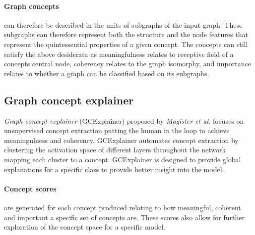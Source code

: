 
\paragraph{Graph concepts} can therefore be described in the units of subgraphs of the input graph.
These subgraphs can therefore represent both the structure and the node features that represent the quintessential properties of a given concept.
The concepts can still satisfy the above desiderata as meaningfulness relates to receptive field of a concepts central node, coherency relates to the graph isomorphy, and importance relates to whether a graph can be classified based on its subgraphs.



\subsection{Graph concept explainer}
\label{sec:GCE}



\emph{Graph concept explainer} (GCExplainer) proposed by \textit{Magister et al.}\cite{magister2021gcexplainer} focuses on unsupervised concept extraction putting the human in the loop to achieve meaningulness and coherency.
GCExplainer automates concept extraction by clustering the activation space of different layers throughout the network mapping each cluster to a concept.
GCExplainer is designed to provide global explanations for a specific class to provide better insight into the model.



\paragraph{Concept scores} are generated for each concept produced relating to how meaningful, coherent and important a specific set of concepts are.
These scores also allow for further exploration of the concept space for a specific model.

